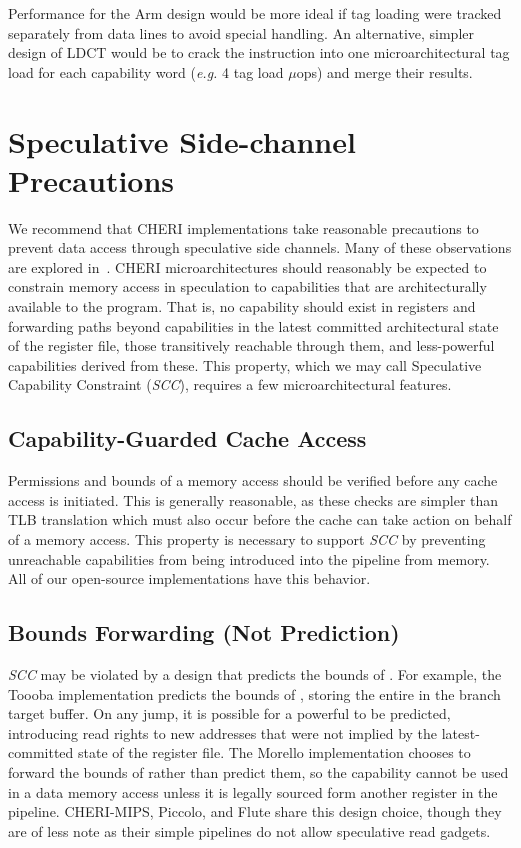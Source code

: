 Performance for the Arm design would be more ideal if tag loading were tracked separately from data lines to avoid special handling.
An alternative, simpler design of LDCT would be to crack the instruction into one microarchitectural tag load for each capability word (\textit{e.g.} 4 tag load $\mu$ops) and merge their results.

\section{Speculative Side-channel Precautions}
We recommend that CHERI implementations take reasonable precautions to prevent data access through speculative side channels.
Many of these observations are explored in~\cite{UCAM-CL-TR-916}.
CHERI microarchitectures should reasonably be expected to constrain memory access in speculation to capabilities that are architecturally available to the program.
That is, no capability should exist in registers and forwarding paths beyond capabilities in the latest committed architectural state of the register file, those transitively reachable through them, and less-powerful capabilities derived from these.
This property, which we may call Speculative Capability Constraint (\emph{SCC}), requires a few microarchitectural features.

\subsection{Capability-Guarded Cache Access}
Permissions and bounds of a memory access should be verified before any cache access is initiated.
This is generally reasonable, as these checks are simpler than TLB translation which must also occur before the cache can take action on behalf of a memory access.
This property is necessary to support \emph{SCC} by preventing unreachable capabilities from being introduced into the pipeline from memory.
All of our open-source implementations have this behavior.

\subsection{\PCC{} Bounds Forwarding (Not Prediction)}
\emph{SCC} may be violated by a design that predicts the bounds of \PCC{}.
For example, the Toooba implementation predicts the bounds of \PCC{}, storing the entire \PCC{} in the branch target buffer.
On any jump, it is possible for a powerful \PCC{} to be predicted, introducing read rights to new addresses that were not implied by the latest-committed state of the register file.
The Morello implementation chooses to forward the bounds of \PCC{} rather than predict them, so the \PCC{} capability cannot be used in a data memory access unless it is legally sourced form another register in the pipeline.
CHERI-MIPS, Piccolo, and Flute share this design choice, though they are of less note as their simple pipelines do not allow speculative read gadgets.

